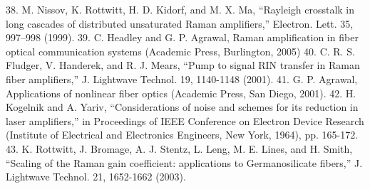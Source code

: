 38.	M. Nissov, K. Rottwitt, H. D. Kidorf, and M. X. Ma, “Rayleigh crosstalk in long cascades of distributed unsaturated Raman amplifiers,” Electron. Lett. 35, 997--998 (1999).
39.	C. Headley and G. P. Agrawal, Raman amplification in fiber optical communication systems (Academic Press, Burlington, 2005)
40.	C. R. S. Fludger, V. Handerek, and R. J. Mears, “Pump to signal RIN transfer in Raman fiber amplifiers,” J. Lightwave Technol. 19, 1140-1148 (2001).
41.	G. P. Agrawal, Applications of nonlinear fiber optics (Academic Press, San Diego, 2001).
42.	H. Kogelnik and A. Yariv, “Considerations of noise and schemes for its reduction in laser amplifiers,” in Proceedings of IEEE Conference on Electron Device Research (Institute of Electrical and Electronics Engineers, New York, 1964), pp. 165-172.
43.	K. Rottwitt, J. Bromage, A. J. Stentz, L. Leng, M. E. Lines, and H. Smith, “Scaling of the Raman gain coefficient: applications to Germanosilicate fibers,” J. Lightwave Technol. 21, 1652-1662 (2003).
 
